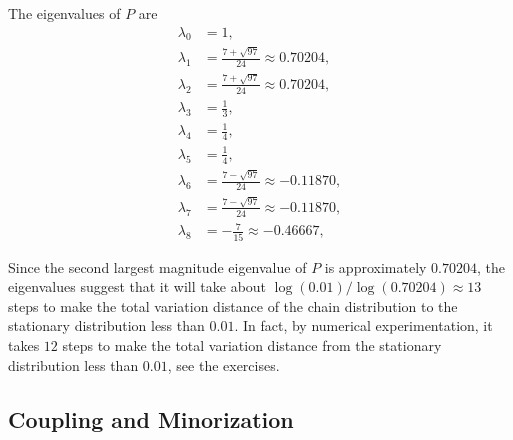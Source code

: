 \documentclass[12pt]{article}
\begin{document}
\begin{example}
    The eigenvalues of \( P \) are
    \begin{align*}
        \lambda_0 &= 1, \\
        \lambda_1 &= \frac{7 + \sqrt{97}}{24} \approx 0.70204, \\
        \lambda_2 &= \frac{7 + \sqrt{97}}{24} \approx 0.70204, \\
        \lambda_3 &= \frac{1}{3}, \\
        \lambda_4 &= \frac{1}{4}, \\
        \lambda_5 &= \frac{1}{4}, \\
        \lambda_6 &= \frac{7 - \sqrt{97}}{24} \approx -0.11870, \\
        \lambda_7 &= \frac{7 - \sqrt{97}}{24} \approx -0.11870, \\
        \lambda_8 &= -\frac{7}{15} \approx -0.46667,
    \end{align*}

    Since the second largest magnitude eigenvalue of \( P \) is
    approximately \( 0.70204 \), the eigenvalues suggest that it will
    take about \( \log(0.01)/\log(0.70204) \approx 13 \) steps to make
    the total variation distance of the chain distribution to the
    stationary distribution less than \( 0.01 \).  In fact, by numerical
    experimentation, it takes \( 12 \) steps to make the total variation
    distance from the stationary distribution less than \( 0.01 \),
    see the exercises.

\end{example}

\subsection*{Coupling and Minorization}
\end{document}
